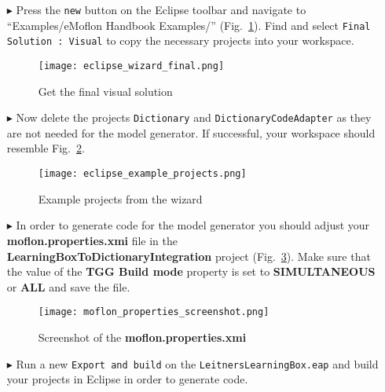 \begin{itemize}
\renewcommand\figurename{Figure}
\item[$\blacktriangleright$] Press the \texttt{new} button on the Eclipse toolbar and navigate to ``Examples/eMoflon Handbook Examples/''
(Fig.~\ref{eclipse:finalSolutionWizard}). Find and select \texttt{Final Solution : Visual} to copy the necessary projects into your workspace.

\vspace{0.5cm}

\begin{figure}[htbp]
\begin{center}
  \texttt{[image: eclipse\_wizard\_final.png]}
  \caption{Get the final visual solution}
  \label{eclipse:finalSolutionWizard}
\end{center}
\end{figure}

\item[$\blacktriangleright$] Now delete the projects \texttt{Dictionary} and \texttt{DictionaryCodeAdapter} as they are not needed for the model generator. 
If successful, your workspace should resemble Fig.~\ref{eclipse:loadedDictionaryMetamodel}. 


\begin{figure}[htbp] 
\renewcommand\figurename{Figure}
\begin{center}
  \texttt{[image: eclipse\_example\_projects.png]}
  \caption{Example projects from the wizard}
  \label{eclipse:loadedDictionaryMetamodel}
\end{center}
\end{figure}


\item[$\blacktriangleright$] In order to generate code for the model generator you should adjust your \textbf{moflon.properties.xmi} file in the \textbf{LearningBoxToDictionaryIntegration} project (Fig.~\ref{fig:moflon_properties_screenshot}).
Make sure that the value of the \textbf{TGG Build mode}
property is set to \textbf{SIMULTANEOUS} or \textbf{ALL} and save the file.


\begin{figure}[h]
\renewcommand\figurename{Figure}
\centering 
\texttt{[image: moflon\_properties\_screenshot.png]}
\caption{Screenshot of the \textbf{moflon.properties.xmi}}
\label{fig:moflon_properties_screenshot}
\end{figure}

\item[$\blacktriangleright$] Run a new \texttt{Export and build} on the \texttt{LeitnersLearningBox.eap} and build your projects in Eclipse in order to generate code. 


\end{itemize}
 
